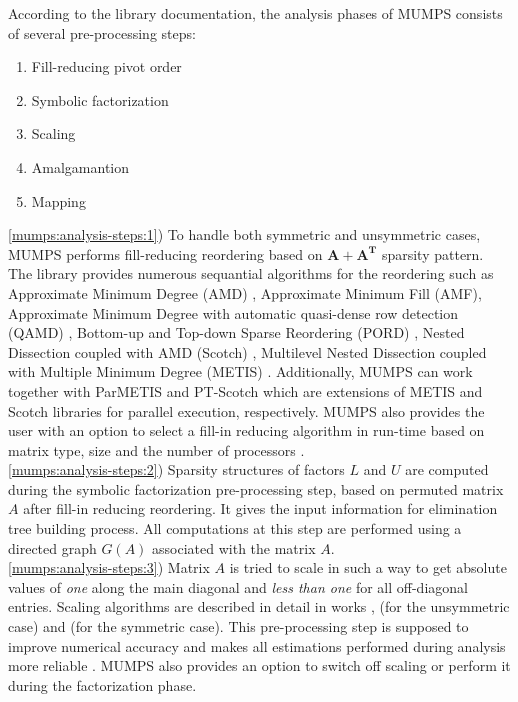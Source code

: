 According to the library documentation, the analysis phases of MUMPS consists of several pre-processing steps:

\begin{enumerate}
  \item Fill-reducing pivot order \label{mumps:analysis-steps:1}
  \item Symbolic factorization \label{mumps:analysis-steps:2}
  \item Scaling \label{mumps:analysis-steps:3}
  \item Amalgamantion \label{mumps:analysis-steps:4}
  \item Mapping \label{mumps:analysis-steps:5}
\end{enumerate}


\ref{mumps:analysis-steps:1}) To handle both symmetric and unsymmetric cases, MUMPS performs fill-reducing reordering based on $\boldsymbol{A} + \boldsymbol{A^T}$ sparsity pattern. The library provides numerous sequantial algorithms for the reordering such as Approximate Minimum Degree (AMD) \cite{reordering:AMD}, Approximate Minimum Fill (AMF), Approximate Minimum Degree with automatic quasi-dense row detection (QAMD) \cite{reordering:QAMD}, Bottom-up and Top-down Sparse Reordering (PORD) \cite{reordering:PORD}, Nested Dissection coupled with AMD (Scotch) \cite{reordering:SCOTCH}, Multilevel Nested Dissection coupled with Multiple Minimum Degree (METIS) \cite{reordering:METIS}. Additionally, MUMPS can work together with ParMETIS and PT-Scotch which are extensions of METIS and Scotch libraries for parallel execution, respectively. MUMPS also provides the user with an option to select a fill-in reducing algorithm in run-time based on matrix type, size and the number of processors \cite{mumps-manual}.\\


\ref{mumps:analysis-steps:2}) Sparsity structures of factors $L$ and $U$ are computed during the symbolic factorization pre-processing step, based on permuted matrix $A$ after fill-in reducing reordering. It gives the input information for elimination tree building process.  All computations at this step are performed using a directed graph $G(A)$ associated with the matrix $A$.\\


\ref{mumps:analysis-steps:3}) Matrix $A$ is tried to scale in such a way to get absolute values of \textit{one} along the main diagonal and \textit{less than one} for all off-diagonal entries. Scaling algorithms are described in detail in works \cite{mm:scaling:duff1999design}, \cite{mm:scaling:duff2001algorithms} (for the unsymmetric case) and \cite{mm:scaling:duff2005strategies} (for the symmetric case). This pre-processing step is supposed to improve numerical accuracy and makes all estimations performed during analysis more reliable \cite{mumps-manual}. MUMPS also provides an option to switch off scaling or perform it during the factorization phase.\\



